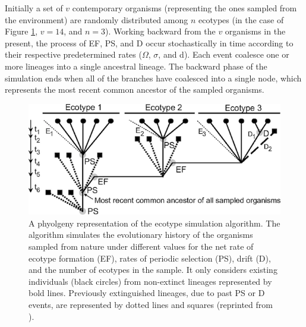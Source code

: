 Initially a set of $v$ contemporary organisms (representing the ones sampled from the environment) are randomly distributed among $n$ ecotypes (in the case of Figure \ref{fig:SpeciationGraph}, $v = 14$, and $n = 3$).
Working backward from the $v$ organisms in the present, the process of EF, PS, and D occur stochastically in time according to their respective predetermined rates ($\Omega$, $\sigma$, and d).
Each event coalesce one or more lineages into  a single ancestral lineage.
The backward phase of the simulation ends when all of the branches have coalesced into a single node, which represents the most recent common ancestor of the sampled organisms.

\begin{figure}[h!]

  \centering
   \includegraphics{images/Speciation-CH2}
   \caption[Detailed phylogeny with putative ecotype simulation events.]{A phyolgeny representation of the ecotype simulation algorithm. The algorithm simulates the evolutionary history of the organisms sampled from nature under different values for the net rate of ecotype formation (EF), rates of periodic selection (PS), drift (D), and the number of ecotypes in the sample. It only considers existing individuals (black circles) from non-extinct lineages represented by bold lines. Previously extinguished lineages, due to past PS or D events, are represented by dotted lines and squares (reprinted from \protect\cite{koeppel2008identifying}).}
   \label{fig:SpeciationGraph}
\end{figure}

